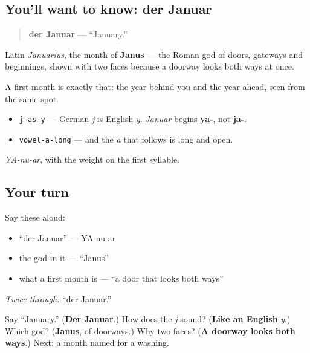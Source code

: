 \subsection*{You'll want to know: der Januar}
\begin{quote}
\textbf{der Januar} — \textquotedblleft{}January.\textquotedblright{}
\end{quote}

Latin \emph{Januarius}, the month of \textbf{Janus} — the Roman god of doors, gateways and beginnings, shown with two faces because a doorway looks both ways at once.

A first month is exactly that: the year behind you and the year ahead, seen from the same spot.

\begin{sounds}
\begin{itemize}
\raggedright
  \item \texttt{j-as-y} — German \emph{j} is English \emph{y}. \emph{Januar} begins \textbf{ya-}, not \textbf{ja-}.
  \item \texttt{vowel-a-long} — and the \emph{a} that follows is long and open.
\end{itemize}

\emph{YA-nu-ar}, with the weight on the first syllable.
\end{sounds}

\subsection*{Your turn}
Say these aloud:

\begin{itemize}
\raggedright
  \item \textquotedblleft{}der Januar\textquotedblright{} — YA-nu-ar
  \item the god in it — \textquotedblleft{}Janus\textquotedblright{}
  \item what a first month is — \textquotedblleft{}a door that looks both ways\textquotedblright{}
\end{itemize}

\emph{Twice through:} \textquotedblleft{}der Januar.\textquotedblright{}

\begin{tcolorbox}[breakable,colback=teal!4,colframe=teal!35!black,title={Before you move on}]
Say \textquotedblleft{}January.\textquotedblright{} (\textbf{Der Januar}.) How does the \emph{j} sound? (\textbf{Like an English} \emph{y}.) Which god? (\textbf{Janus}, of doorways.) Why two faces? (\textbf{A doorway looks both ways}.) Next: a month named for a washing.
\end{tcolorbox}
